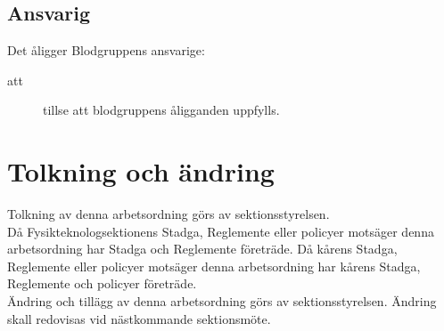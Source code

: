 \subsection{Ansvarig}
Det åligger Blodgruppens ansvarige:
    \begin{description}
        \item[att] tillse att blodgruppens åligganden uppfylls. 
    \end{description}




\section{Tolkning och ändring}
Tolkning av denna arbetsordning görs av sektionsstyrelsen.\\ 
Då Fysikteknologsektionens Stadga, Reglemente eller policyer motsäger denna arbetsordning har Stadga och Reglemente företräde. Då kårens Stadga, Reglemente eller policyer motsäger denna arbetsordning har kårens Stadga, Reglemente och policyer företräde.\\
Ändring och tillägg av denna arbetsordning görs av sektionsstyrelsen. Ändring skall redovisas vid nästkommande sektionsmöte. 

\newpage
